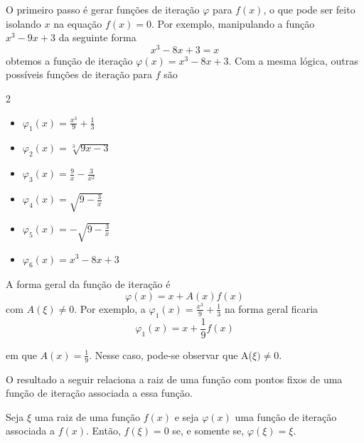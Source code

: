 O primeiro passo é gerar funções de iteração $\varphi$ para $f(x)$, o que pode
ser feito isolando $x$ na equação $f(x) = 0$. Por exemplo, manipulando a função
$x^3 -9x + 3$ da seguinte forma
\begin{equation*}
    x^3 - 8x + 3 = x
\end{equation*}
obtemos a função de iteração $\varphi(x) = x^3 - 8x + 3$. Com a mesma lógica, outras possíveis funções de iteração para $f$ são

\begin{multicols}{2}
    \begin{itemize} %
        \item[a)] $\varphi_1(x) = \frac{x^3}{9} + \frac{1}{3}$
        \item[b)] $\varphi_2(x) = \sqrt[3]{9x-3}$
        \item[c)] $\varphi_3(x) = \frac{9}{x} - \frac{3}{x^2}$
        \item[d)] $\varphi_4(x) = \sqrt{9 - \frac{3}{x}}$
        \item[e)] $\varphi_5(x) = -\sqrt{9 - \frac{3}{x}}$
        \item[f)] $\varphi_6(x) = x^3 - 8x + 3$
    \end{itemize}
\end{multicols}
A forma geral da função de iteração é
\begin{equation}
    \varphi(x) = x + A(x)f(x) \label{it}
\end{equation}
com $A(\xi) \ne 0$.
Por exemplo, a $\varphi_1(x) = \frac{x^3}{9} + \frac{1}{3}$ na forma geral
ficaria
\begin{equation*}
    \varphi_1(x) = x + \frac{1}{9}f(x)
\end{equation*}

em que $A(x) = \frac{1}{9}$. Nesse caso, pode-se observar que A($\xi) \neq 0$.

O resultado a seguir relaciona a raiz de uma função com pontos fixos de uma
função de iteração associada a essa função.

\begin{prop}
    Seja $\xi$ uma raiz de uma função $f(x)$ e seja $\varphi(x)$ uma função de iteração associada a $f(x)$. Então, $f(\xi) = 0$ se, e somente se, $\varphi(\xi) = \xi$.
\end{prop}

